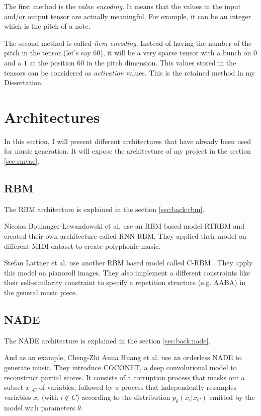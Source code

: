 \documentclass[12pt]{report}
\begin{document}
The first method is the \textit{value encoding}.
It means that the values in the input and/or output tensor are actually meaningful.
For example, it can be an integer which is the pitch of a note.

The second method is called \textit{item encoding}.
Instead of having the number of the pitch in the tensor (let's say $60$), it will be a very sparse tensor with a bunch on $0$ and a $1$ at the position $60$ in the pitch dimension.
This values stored in the tensors can be considered as \textit{activation} values.
This is the retained method in my Dissertation.


\section{Architectures}
\label{sec:related-works:architectures}


In this section, I will present different architectures that have already been used for music generation. It will expose the architecture of my project in the section \ref{sec:rmvae}.


\subsection{RBM}

The RBM architecture is explained in the section \ref{sec:back:rbm}.

Nicolas Boulanger-Lewandowski et al. \cite{boulanger-lewandowski_modeling_2012} use an RBM based model RTRBM \cite{sutskever_recurrent_nodate, mittelman_structured_nodate} and created their own architecture called RNN-RBM.
They applied their model on different MIDI dataset to create polyphonic music.

Stefan Lattner et al. \cite{lattner_imposing_2018} use another RBM based model called C-RBM \cite{norouzi_convolutional_nodate, norouzi_stacks_nodate}.
They apply this model on pianoroll images.
They also implement a different constraints like their self-similarity constraint to specify a repetition structure (e.g. AABA) in the general music piece.


\subsection{NADE}
\label{sec:rw:nade}

The NADE architecture is explained in the section \ref{sec:back:nade}.

And as an example, Cheng-Zhi Anna Huang et al. \cite{huang_counterpoint_2017} use an orderless NADE \cite{uria_deep_2014} to generate music. They introduce COCONET, a deep convolutional model to reconstruct partial scores.
It consists of a corruption process that masks out a subset $x_{\neg C}$ of variables, followed by a process that independently resamples variables $x_{i}$ (with $i \not \in C$) according to the distribution $p_{\theta} (x_i | x_C )$ emitted by the model with parameters $\theta$.
\end{document}
